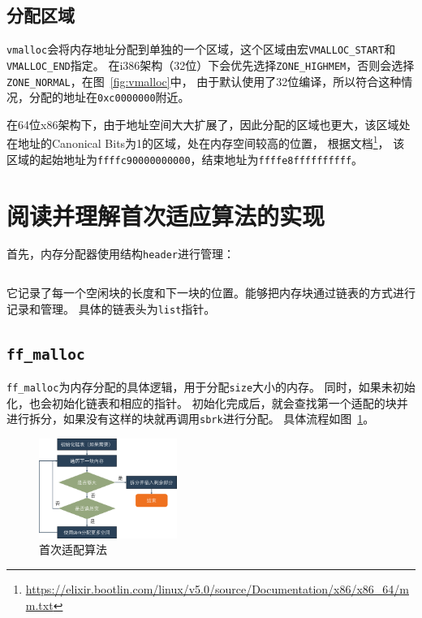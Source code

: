 \documentclass[a4paper,twoside]{article}
\begin{document}
\begin{spacing}{1.2}
\subsection{分配区域}

\texttt{vmalloc}会将内存地址分配到单独的一个区域，这个区域由宏\texttt{VMALLOC\_START}和\texttt{VMALLOC\_END}指定。
在i386架构（32位）下会优先选择\texttt{ZONE\_HIGHMEM}，否则会选择\texttt{ZONE\_NORMAL}，在图~\ref{fig:vmalloc}中，
由于默认使用了32位编译，所以符合这种情况，分配的地址在\texttt{0xc0000000}附近。

在64位x86架构下，由于地址空间大大扩展了，因此分配的区域也更大，该区域处在地址的Canonical Bits为1的区域，处在内存空间较高的位置，
根据文档\footnote{\url{https://elixir.bootlin.com/linux/v5.0/source/Documentation/x86/x86_64/mm.txt}}，
该区域的起始地址为\texttt{ffffc90000000000}，结束地址为\texttt{ffffe8ffffffffff}。

\section{阅读并理解首次适应算法的实现}

首先，内存分配器使用结构\texttt{header}进行管理：
\inputminted[firstline=10,lastline=18]{c}{../code/3/ff_malloc.c}
它记录了每一个空闲块的长度和下一块的位置。能够把内存块通过链表的方式进行记录和管理。
具体的链表头为\texttt{list}指针。

\subsection{\texttt{ff\_malloc}}

\texttt{ff\_malloc}为内存分配的具体逻辑，用于分配\texttt{size}大小的内存。
同时，如果未初始化，也会初始化链表和相应的指针。
初始化完成后，就会查找第一个适配的块并进行拆分，如果没有这样的块就再调用\texttt{sbrk}进行分配。
具体流程如图~\ref{fig:ff}。

\begin{figure}[htb]
	\centering
	\caption{首次适配算法}
	\label{fig:ff}
	\includegraphics[width=0.4\textwidth]{images/ff.png}
\end{figure}



\end{spacing}
\end{document}
